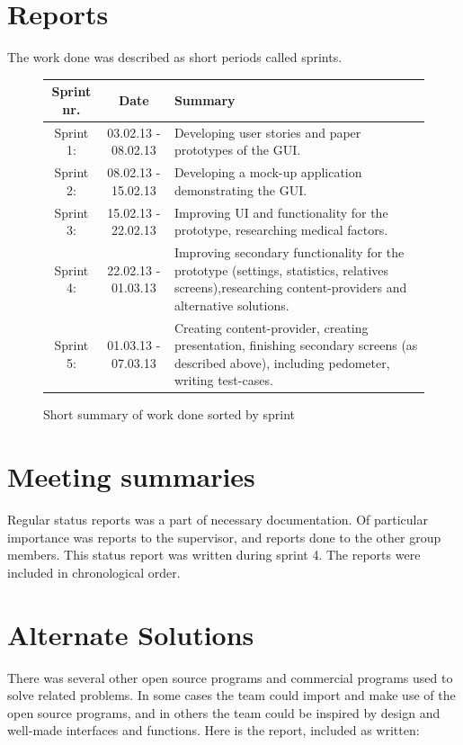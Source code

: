 \section{Reports}
The work done was described as short periods called sprints. 
\begin{figure}
\caption{Short summary of work done sorted by sprint}
\begin{tabular}{|c|c|p{7cm}|}
\hline
Sprint nr. & Date & Summary\\
\hline
Sprint 1: & 03.02.13 - 08.02.13 & Developing user stories and paper prototypes of the GUI.\\ 
\hline
Sprint 2: & 08.02.13 - 15.02.13 & Developing a mock-up application demonstrating the GUI.\\
\hline
Sprint 3: & 15.02.13 - 22.02.13 & Improving UI and functionality for the prototype, researching medical factors. \\
\hline
Sprint 4: & 22.02.13 - 01.03.13 & Improving secondary functionality for the prototype (settings, statistics, relatives screens),researching content-providers and alternative solutions. \\
\hline
Sprint 5: & 01.03.13 - 07.03.13 & Creating content-provider, creating presentation, finishing secondary screens (as described above), including pedometer, writing test-cases.\\
\hline
\end{tabular} 
\label{tab:sprintList}
\end{figure}
\newpage

\section{Meeting summaries}
Regular status reports was a part of necessary documentation. Of particular importance was reports to the supervisor, and reports done to the other group members. This status report was written during sprint 4. The reports were included in chronological order.






\section{Alternate Solutions}
There was several other open source programs and commercial programs used to solve related problems. In some cases the team could import and make use of the open source programs, and in others the team could be inspired by design and well-made interfaces and functions. Here is the report, included as written:


